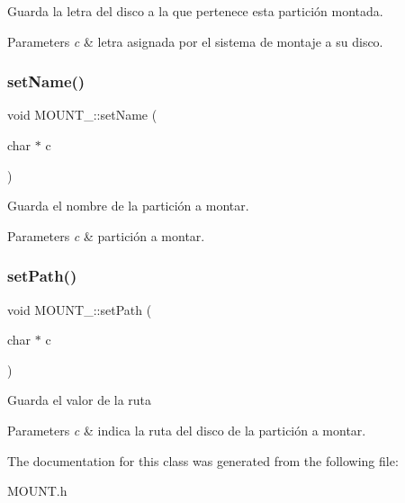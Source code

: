 Guarda la letra del disco a la que pertenece esta partición montada. 
\begin{DoxyParams}{Parameters}
{\em c} & letra asignada por el sistema de montaje a su disco. \\
\hline
\end{DoxyParams}
\mbox{\label{classMOUNT___a07920ca266d5f28996f14ac76d5cfbd4}} 
\subsubsection{\texorpdfstring{set\+Name()}{setName()}}
{\footnotesize\ttfamily void M\+O\+U\+N\+T\+\_\+\+::set\+Name (\begin{DoxyParamCaption}\item[{char $\ast$}]{c }\end{DoxyParamCaption})\hspace{0.3cm}{\ttfamily [inline]}}

Guarda el nombre de la partición a montar. 
\begin{DoxyParams}{Parameters}
{\em c} & partición a montar. \\
\hline
\end{DoxyParams}
\mbox{\label{classMOUNT___a6d628a264a4f7652fb79db60a8f74d5c}} 
\subsubsection{\texorpdfstring{set\+Path()}{setPath()}}
{\footnotesize\ttfamily void M\+O\+U\+N\+T\+\_\+\+::set\+Path (\begin{DoxyParamCaption}\item[{char $\ast$}]{c }\end{DoxyParamCaption})\hspace{0.3cm}{\ttfamily [inline]}}

Guarda el valor de la ruta 
\begin{DoxyParams}{Parameters}
{\em c} & indica la ruta del disco de la partición a montar. \\
\hline
\end{DoxyParams}


The documentation for this class was generated from the following file\+:\begin{DoxyCompactItemize}
\item 
M\+O\+U\+N\+T.\+h\end{DoxyCompactItemize}
